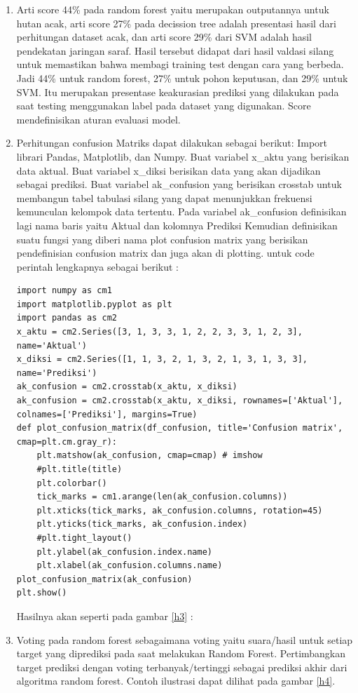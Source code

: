 \begin{enumerate}
\item Arti score 44\% pada random forest yaitu merupakan outputannya untuk hutan acak, arti score 27\% pada decission tree adalah presentasi hasil dari perhitungan dataset acak, dan arti score 29\% dari SVM adalah hasil pendekatan jaringan saraf.  Hasil tersebut didapat dari hasil valdasi silang untuk memastikan bahwa membagi training test dengan cara yang berbeda. Jadi 44\% untuk random forest, 27\% untuk pohon keputusan, dan 29\% untuk SVM. Itu merupakan presentase keakurasian prediksi yang dilakukan pada saat testing menggunakan label pada dataset yang digunakan. Score mendefinisikan aturan evaluasi model.
\item Perhitungan confusion Matriks dapat dilakukan sebagai berikut:
\subitem Import librari Pandas, Matplotlib, dan Numpy.
\subitem Buat variabel x\_aktu yang berisikan data aktual.
\subitem Buat variabel x\_diksi berisikan data yang akan dijadikan sebagai prediksi.
\subitem Buat variabel ak\_confusion yang berisikan crosstab untuk membangun tabel tabulasi silang yang dapat menunjukkan frekuensi kemunculan kelompok data tertentu.
\subitem Pada variabel ak\_confusion definisikan lagi nama baris yaitu Aktual dan kolomnya Prediksi
\subitem Kemudian definisikan suatu fungsi yang diberi nama plot confusion matrix yang berisikan pendefinisian confusion matrix dan juga akan di plotting. untuk code perintah lengkapnya sebagai berikut :
\subitem
\begin{verbatim}
import numpy as cm1
import matplotlib.pyplot as plt
import pandas as cm2
x_aktu = cm2.Series([3, 1, 3, 3, 1, 2, 2, 3, 3, 1, 2, 3], name='Aktual')
x_diksi = cm2.Series([1, 1, 3, 2, 1, 3, 2, 1, 3, 1, 3, 3], name='Prediksi')
ak_confusion = cm2.crosstab(x_aktu, x_diksi)
ak_confusion = cm2.crosstab(x_aktu, x_diksi, rownames=['Aktual'], colnames=['Prediksi'], margins=True)
def plot_confusion_matrix(df_confusion, title='Confusion matrix', cmap=plt.cm.gray_r):
    plt.matshow(ak_confusion, cmap=cmap) # imshow
    #plt.title(title)
    plt.colorbar()
    tick_marks = cm1.arange(len(ak_confusion.columns))
    plt.xticks(tick_marks, ak_confusion.columns, rotation=45)
    plt.yticks(tick_marks, ak_confusion.index)
    #plt.tight_layout()
    plt.ylabel(ak_confusion.index.name)
    plt.xlabel(ak_confusion.columns.name)
plot_confusion_matrix(ak_confusion)
plt.show()
\end{verbatim}
Hasilnya akan seperti pada gambar \ref{h3} :
\item Voting pada random forest sebagaimana voting yaitu suara/hasil untuk setiap target yang diprediksi pada saat melakukan Random Forest. Pertimbangkan target prediksi dengan voting terbanyak/tertinggi sebagai prediksi akhir dari algoritma random forest. Contoh ilustrasi dapat dilihat pada gambar \ref{h4}.
\end{enumerate}

